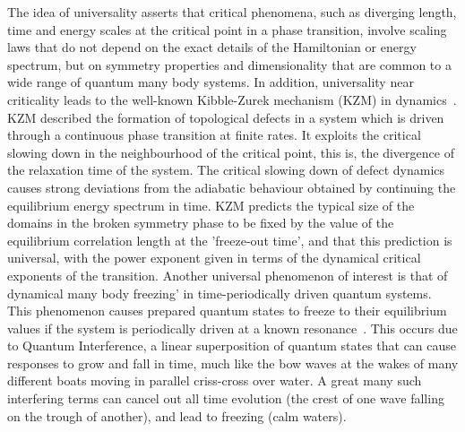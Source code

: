 \documentclass[a4paper,11pt,color]{article}
\begin{document}
The idea of universality asserts that critical phenomena, such as diverging length, time and energy  scales at the critical point in a phase transition, involve scaling laws that do not depend on the exact details of the Hamiltonian or energy spectrum, but on symmetry properties and dimensionality that are common to a wide range of quantum many body systems. In addition, universality near criticality leads  to the well-known Kibble-Zurek mechanism (KZM) in dynamics~\cite{kzm}. KZM described the formation of topological defects in a system which is driven through a continuous phase transition at finite rates. It exploits the critical slowing down in the neighbourhood of the critical point, this is, the divergence of the relaxation time of the system. The critical slowing down of defect dynamics causes strong deviations from the adiabatic behaviour obtained by continuing the equilibrium energy spectrum in time. KZM predicts the typical size of the domains in the broken symmetry phase to be fixed by the value of the equilibrium correlation length at the 'freeze-out time', and that this prediction is universal, with the power exponent given in terms of the dynamical critical exponents of the transition. Another universal phenomenon of interest is that of dynamical many body freezing' in time-periodically driven quantum systems. This phenomenon causes prepared quantum states to freeze to their equilibrium values if the system is periodically driven at a known resonance~\cite{freezing}. This occurs due to Quantum Interference, a linear superposition of quantum states that can cause responses to grow and fall in time, much like the bow waves at the wakes of many different boats moving in parallel criss-cross over water. A great many such interfering terms can cancel out all time evolution (the crest of one wave falling on the trough of another), and lead to freezing (calm waters). 
\end{document}
